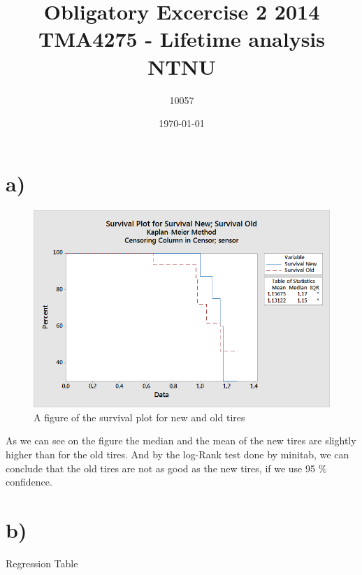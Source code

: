 \documentclass[10pt, a4paper]{article}
\begin{document}
\title{Obligatory Excercise 2 2014\\
\normalsize TMA4275 - Lifetime analysis\\
			NTNU}
\author{10057}
\date{\today}

\begin{titlepage}
\maketitle
\thispagestyle{empty}
\end{titlepage}

\section*{a)} 	%
\begin{figure}[h!]
\centering
\includegraphics[scale=0.75]{Kaplan1.png}
\caption{A figure of the survival plot for new and old tires}
\label{Kaplan1}
\end{figure}
As we can see on the figure the median and the mean of the new tires are slightly higher than for the old tires. And by the log-Rank test done by minitab, we can conclude that the old tires are not as good as the new tires, if we use 95 \% confidence.

\section*{b)} 	%

Regression Table
\end{document}
